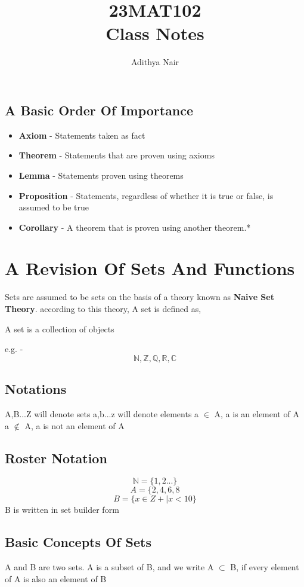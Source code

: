 \documentclass{report}
\title{\Huge{23MAT102}\\ Class Notes}
\author{\huge{Adithya Nair}}
\date{}
\begin{document}
\maketitle
\newpage%
\tableofcontents

\pagebreak
\section{A Basic Order Of Importance}
\begin{itemize}
    \item \textbf{Axiom} - Statements taken as fact
    \item \textbf{Theorem} - Statements that are proven using axioms
    \item \textbf{Lemma} - Statements proven using theorems
    \item \textbf{Proposition} - Statements, regardless of whether it is true or false, is assumed to be true
    \item \textbf{Corollary} - A theorem that is proven using another theorem.*
\end{itemize}
\chapter{A Revision Of Sets And Functions}
Sets are assumed to be sets on the basis of a theory known as \textbf{Naive Set Theory}. according to this theory, A set is defined as,

\begin{definition}[Sets]
A set is a collection of objects
\end{definition}

e.g. - \[\mathbb{N}, \mathbb{Z}, \mathbb{Q}, \mathbb{R}, \mathbb{C}\]

\section{Notations}
A,B...Z will denote sets
a,b...z will denote elements
a $\in$ A, a is an element of A
a $\notin$  A, a is not an element of A

\section{Roster Notation}
\[\mathbb{N} = \{1,2...\}\]
\[A = \{2,4,6,8\]
\[B = \{ x \in Z+| x < 10 \} \]
 B is written in set builder form

\section{Basic Concepts Of Sets}
\begin{definition}[Subsets]
A and B are two sets. A is a subset of B, and we write A $\subset$ B, if every element of A is also an element of B
\end{definition}
\end{document}
